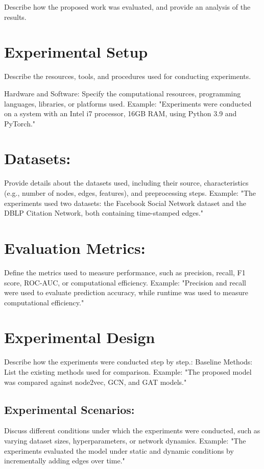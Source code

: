 \label{chap.4}
Describe how the proposed work was evaluated, and provide an analysis of the results.
\section{Experimental Setup}
 Describe the resources, tools, and procedures used for conducting experiments.

Hardware and Software: Specify the computational resources, programming languages, libraries, or platforms used.
Example: "Experiments were conducted on a system with an Intel i7 processor, 16GB RAM, using Python 3.9 and PyTorch."
\section{Datasets:} Provide details about the datasets used, including their source, characteristics (e.g., number of nodes, edges, features), and preprocessing steps.
Example: "The experiments used two datasets: the Facebook Social Network dataset and the DBLP Citation Network, both containing time-stamped edges."
\section{Evaluation Metrics:}Define the metrics used to measure performance, such as precision, recall, F1 score, ROC-AUC, or computational efficiency.
Example: "Precision and recall were used to evaluate prediction accuracy, while runtime was used to measure computational efficiency."
\section{Experimental Design}
 Describe how the experiments were conducted step by step.:
Baseline Methods: List the existing methods used for comparison.
Example: "The proposed model was compared against node2vec, GCN, and GAT models."
\subsection{Experimental Scenarios:} Discuss different conditions under which the experiments were conducted, such as varying dataset sizes, hyperparameters, or network dynamics.
Example: "The experiments evaluated the model under static and dynamic conditions by incrementally adding edges over time."
